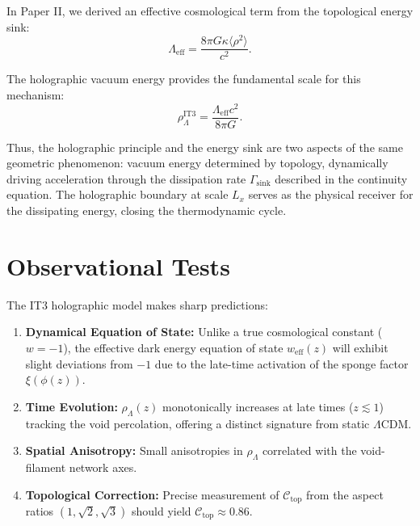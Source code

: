 \documentclass[12pt,a4paper]{article}
\begin{document}
In Paper II, we derived an effective cosmological term from the topological energy sink:
\begin{equation}
\Lambda_{\mathrm{eff}} = \frac{8\pi G \kappa \langle \rho^2 \rangle}{c^2}.
\end{equation}

The holographic vacuum energy provides the fundamental scale for this mechanism:
\begin{equation}
\rho_{\Lambda}^{\mathrm{IT3}} = \frac{\Lambda_{\mathrm{eff}} c^2}{8\pi G}.
\end{equation}

Thus, the holographic principle and the energy sink are two aspects of the same geometric phenomenon: vacuum energy determined by topology, dynamically driving acceleration through the dissipation rate $\Gamma_{\mathrm{sink}}$ described in the continuity equation. The holographic boundary at scale $L_x$ serves as the physical receiver for the dissipating energy, closing the thermodynamic cycle.

\section{Observational Tests}

The IT3 holographic model makes sharp predictions:

\begin{enumerate}
    \item \textbf{Dynamical Equation of State:} Unlike a true cosmological constant ($w=-1$), the effective dark energy equation of state $w_{\mathrm{eff}}(z)$ will exhibit slight deviations from $-1$ due to the late-time activation of the sponge factor $\xi(\phi(z))$.
    
    \item \textbf{Time Evolution:} $\rho_{\Lambda}(z)$ monotonically increases at late times ($z \lesssim 1$) tracking the void percolation, offering a distinct signature from static $\Lambda$CDM.
    
    \item \textbf{Spatial Anisotropy:} Small anisotropies in $\rho_{\Lambda}$ correlated with the void-filament network axes.
    
    \item \textbf{Topological Correction:} Precise measurement of $\mathcal{C}_{\mathrm{top}}$ from the aspect ratios $(1, \sqrt{2}, \sqrt{3})$ should yield $\mathcal{C}_{\mathrm{top}} \approx 0.86$.
\end{enumerate}
\end{document}
